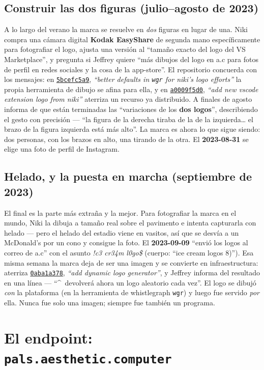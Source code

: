 \documentclass[10pt,letterpaper,twocolumn]{article}
\newcommand{\commit}[2]{\href{https://github.com/whistlegraph/aesthetic-computer/commit/#1}{\texttt{#1}}, \emph{``#2''}}
\begin{document}
\subsection{Construir las dos figuras (julio--agosto de 2023)}
A lo largo del verano la marca se resuelve en \emph{dos} figuras en lugar de
una. Niki compra una cámara digital \textbf{Kodak EasyShare} de segunda mano
específicamente para fotografiar el logo, ajusta una versión al ``tamaño
exacto del logo del VS Marketplace'', y pregunta si Jeffrey quiere ``más
dibujos del logo en a.c para fotos de perfil en redes sociales y la cosa de la
app-store''. El repositorio concuerda con los mensajes: en
\commit{5bcefc5a9}{better defaults in \texttt{wgr} for niki's logo efforts}
la propia herramienta de dibujo se afina para ella, y en
\commit{a0009f5d0}{add new vscode extension logo from niki} aterriza un
recurso ya distribuido. A finales de agosto informa de que están terminadas
las ``variaciones de los \textbf{dos logos}'', describiendo el gesto con
precisión --- ``la figura de la derecha tiraba de la de la izquierda\dots{} el
brazo de la figura izquierda está más alto''. La marca es ahora lo que sigue
siendo: dos personas, con los brazos en alto, una tirando de la otra. El
\textbf{2023-08-31} se elige una foto de perfil de Instagram.

\subsection{Helado, y la puesta en marcha (septiembre de 2023)}
El final es la parte más extraña y la mejor. Para fotografiar la marca en el
mundo, Niki la dibuja a tamaño real sobre el pavimento e intenta capturarla
con helado --- pero el helado del estadio viene en vasitos, así que se desvía
a un McDonald's por un cono y consigue la foto. El \textbf{2023-09-09} ``envió
los logos al correo de a.c'' con el asunto \emph{!c3 cr34m l0go\$} (cuerpo:
``ice cream logos 8)''). Esa misma semana la marca deja de ser una imagen y se
convierte en infraestructura: aterriza \commit{0aba1a378}{add dynamic logo
generator}, y Jeffrey informa del resultado en una línea --- ``\^{}\ devolverá
ahora un logo aleatorio cada vez''. El logo se dibujó \emph{con} la plataforma
(en la herramienta de whistlegraph \texttt{wgr}) y luego fue servido \emph{por}
ella. Nunca fue solo una imagen; siempre fue también un programa.

\section{El endpoint: \texttt{pals.aesthetic.computer}}
\end{document}
